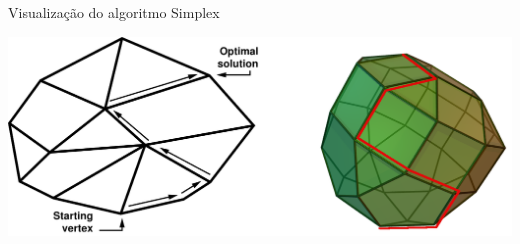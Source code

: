 \documentclass[compress,mathserif]{beamer}
\begin{document}

\begin{frame}{Visualização do algoritmo Simplex}

\vspace{1cm}

\centering \includegraphics[width=\textwidth]{images/simplex_path.png}

\end{frame}

\end{document}
